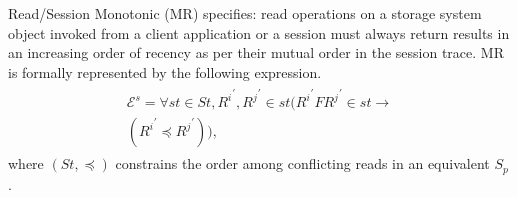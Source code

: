 \documentclass{sig-alternate-05-2015}
\begin{document}
\par Read/Session Monotonic (MR) specifies: read operations on a storage system object invoked from a client application or a session must always return results in an increasing order of recency as per their mutual order in the session trace.
   MR is formally represented by the following expression.
\begin{align}\label{eqn:MR}
\begin{split}
 \mathcal{E}^{s} = \forall  \mathit{st} \in \mathit{St}, {R^i}^{'}, {R^j}^{'} \in \mathit{st} \big( {R^i}^{'} F {R^j}^{'} \in \mathit{st}
 \rightarrow \\ \left( {R^i}^{'} \preccurlyeq {R^j}^{'} \right) \big), 
\end{split}
\end{align} where $\left( \mathit{St}, \preccurlyeq \right)$ constrains  the order among conflicting reads in an equivalent $S_p$.
\end{document}
